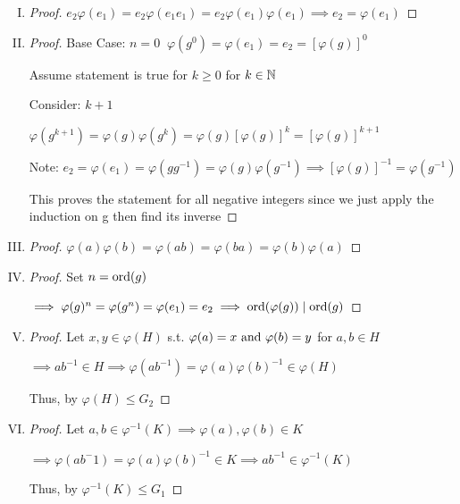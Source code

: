 \begin{enumerate}[I.]
    \item \begin{proof}
        $e_2\varphi(e_1)=e_2\varphi(e_1e_1)=e_2\varphi(e_1)\varphi(e_1)\implies
        e_2=\varphi(e_1)$
    \end{proof}
    \item \begin{proof}
        Base Case: $n=0\;\; \varphi(g^0)=\varphi(e_1)=e_2=[\varphi(g)]^0$

        Assume statement is true for $k\geq0$ for $k \in \mathbb{N}$

        Consider: $k+1$

        $\varphi(g^{k+1})=\varphi(g)\varphi(g^k)=\varphi(g)[\varphi(g)]^k=[\varphi(g)]^{k+1}$

        Note: $e_2=\varphi(e_1)=\varphi(gg^{-1})=\varphi(g)\varphi(g^{-1})\implies [\varphi(g)]^{-1}=\varphi(g^{-1})$

        This proves the statement for all negative integers since we just apply the induction on g then find its inverse
    \end{proof}
    \item \begin{proof}
        $\varphi(a)\varphi(b)=\varphi(ab)=\varphi(ba)=\varphi(b)\varphi(a)$
    \end{proof}
    \item \begin{proof}
        Set $n = \text{ord}(g)$

        $\implies \varphi(g)^n=\varphi(g^n)=\varphi(e_1)=e_2 \implies \text{ord}(\varphi(g)) \mid \text{ord}(g)$
    \end{proof}
    \item \begin{proof}
        Let $x,y \in \varphi(H)$ s.t. $\varphi(a)=x \text{ and } \varphi(b)=y$ for $a,b \in H$

        $\implies ab^{-1}\in H \implies \varphi(ab^{-1})=\varphi(a)\varphi(b)^{-1}\in \varphi(H)$

        Thus, by  $\varphi(H)\leq G_2$
    \end{proof}
    \item \begin{proof}
        Let $a,b \in \varphi^{-1}(K) \implies \varphi(a),\varphi(b)\in K$

        $\implies \varphi(ab^-1)=\varphi(a)\varphi(b)^{-1} \in K \implies ab^{-1}\in \varphi^{-1}(K)$

        Thus, by  $\varphi^{-1}(K)\leq G_1$
    \end{proof}
\end{enumerate}

